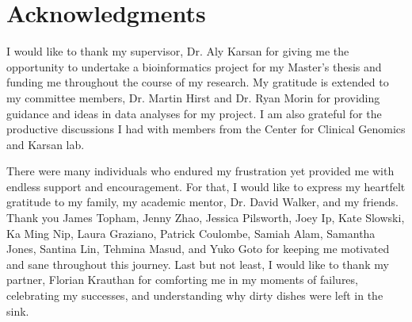 
\chapter{Acknowledgments}

I would like to thank my supervisor, Dr. Aly Karsan for giving me the opportunity to undertake a bioinformatics project for my Master's thesis and funding me throughout the course of my research. My gratitude is extended to my committee members, Dr. Martin Hirst and Dr. Ryan Morin for providing guidance and ideas in data analyses for my project. I am also grateful for the productive discussions I had with members from the Center for Clinical Genomics and Karsan lab.

There were many individuals who endured my frustration yet provided me with endless support and encouragement. For that, I would like to express my heartfelt gratitude to my family, my academic mentor, Dr. David Walker, and my friends. Thank you James Topham, Jenny Zhao, Jessica Pilsworth, Joey Ip, Kate Slowski, Ka Ming Nip, Laura Graziano, Patrick Coulombe, Samiah Alam, Samantha Jones, Santina Lin, Tehmina Masud, and Yuko Goto for keeping me motivated and sane throughout this journey. Last but not least, I would like to thank my partner, Florian Krauthan for comforting me in my moments of failures, celebrating my successes, and understanding why dirty dishes were left in the sink.
